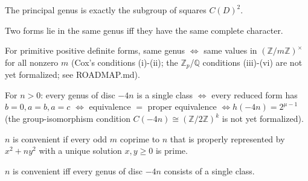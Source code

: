 \begin{theorem}
  \label{thm:t3_15_ii}
  \leanok
  The principal genus is exactly the subgroup of squares $C(D)^2$.
\end{theorem}

\begin{lemma}
  \label{lem:l3_20}
  \leanok
  Two forms lie in the same genus iff they have the same complete character.
\end{lemma}

\begin{theorem}
  \label{thm:t3_21}
  \leanok
  For primitive positive definite forms, same genus $\iff$ same values in
  $(\mathbb Z/m\mathbb Z)^\times$ for all nonzero $m$ (Cox's conditions (i)-(ii);
  the $\mathbb Z_p$/$\mathbb Q$ conditions (iii)-(vi) are not yet formalized;
  see ROADMAP.md).
\end{theorem}

\begin{theorem}
  \label{thm:t3_22}
  \leanok
  For $n>0$: every genus of disc $-4n$ is a single class $\iff$ every reduced form
  has $b=0,a=b,a=c$ $\iff$ equivalence $=$ proper equivalence $\iff h(-4n)=2^{\mu-1}$
  (the group-isomorphism condition $C(-4n)\cong(\mathbb Z/2\mathbb Z)^k$ is not
  yet formalized).
\end{theorem}

\begin{definition}
  \label{def:convenient_number}
  \leanok
  $n$ is convenient if every odd $m$ coprime to $n$ that is properly represented by
  $x^2+ny^2$ with a unique solution $x,y\ge0$ is prime.
\end{definition}

\begin{proposition}
  \label{prop:p3_24}
  \leanok
  $n$ is convenient iff every genus of disc $-4n$ consists of a single class.
\end{proposition}

